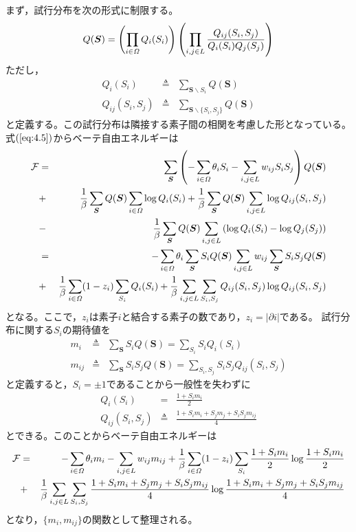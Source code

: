 まず，試行分布を次の形式に制限する。
\begin{equation}
Q(\bm{S})=\left(\prod_{i\in\mathit{\Omega}}Q_{i}(S_{i})\right)
\left(\prod_{i,j\in L}\frac{Q_{ij}(S_{i},S_{j})}
{Q_{i}(S_{i})Q_{j}(S_{j})}\right)\label{eq:4.15}
\end{equation}
ただし，
\begin{eqnarray}
Q_{i}(S_{i})&\triangleq&\sum_{\bm{S}\backslash S_{i}}Q(\bm{S})\label{eq:4.16}\\
Q_{ij}(S_{i},S_{j})&\triangleq&
\sum_{\bm{S}\backslash\{S_{i},S_{j}\}}Q(\bm{S})\label{eq:4.17}
\end{eqnarray}
と定義する。この試行分布は隣接する素子間の相関を考慮した形となっている。
式$(\ref{eq:4.5})$からベーテ自由エネルギーは
\begin{eqnarray}
\mathcal{F}&=&\sum_{\bm{S}}\left(-\sum_{i\in\mathit{\Omega}}\theta_{i}S_{i}
-\sum_{i,j\in L}w_{ij}S_{i}S_{j}\right)Q(\bm{S})\nonumber\\
&+&\frac{1}{\beta}\sum_{\bm{S}}Q(\bm{S})\sum_{i\in\mathit{\Omega}}\log Q_{i}(S_{i})
+\frac{1}{\beta}\sum_{\bm{S}}Q(\bm{S})\sum_{i,j\in L}\log Q_{ij}(S_{i},S_{j})
\nonumber\\
&-&\frac{1}{\beta}\sum_{\bm{S}}Q(\bm{S})\sum_{i,j\in L}\left(
\log Q_{i}(S_{i})-\log Q_{j}(S_{j})\right)\nonumber\\
&=&-\sum_{i\in\mathit{\Omega}}\theta_{i}\sum_{\bm{S}}S_{i}Q(\bm{S})
\sum_{i,j\in L}w_{ij}\sum_{\bm{S}}S_{i}S_{j}Q(\bm{S})\nonumber\\
&+&\frac{1}{\beta}\sum_{i\in\mathit{\Omega}}(1-z_{i})\sum_{S_{i}}Q_{i}(S_{i})
+\frac{1}{\beta}\sum_{i,j\in L}\sum_{S_{i},S_{j}}Q_{ij}(S_{i},S_{j})
\log Q_{ij}(S_{i},S_{j})\label{eq:4.18}
\end{eqnarray}
となる。ここで，$z_{i}$は素子$i$と結合する素子の数であり，$z_{i}=|\partial i|$である。
試行分布に関する$S_{i}$の期待値を
\begin{eqnarray}
m_{i}&\triangleq&\sum_{\bm{S}}S_{i}Q(\bm{S})=\sum_{S_{i}}S_{i}Q_{i}(S_{i})\label{eq:4.19}\\
m_{ij}&\triangleq&\sum_{\bm{S}}S_{i}S_{j}Q(\bm{S})=\sum_{S_{i},S_{j}}S_{i}S_{j}Q_{ij}(S_{i},S_{j})\label{eq:4.20}
\end{eqnarray}
と定義すると，$S_{i}=\pm 1$であることから一般性を失わずに
\begin{eqnarray}
Q_{i}(S_{i})&=&\frac{1+S_{i}m_{i}}{2}\label{eq:4.21}\\
Q_{ij}(S_{i},S_{j})&\triangleq&\frac{1+S_{i}m_{i}+S_{j}m_{j}+S_{i}S_{j}m_{ij}}{4}
\label{eq:4.22}
\end{eqnarray}
とできる。このことからベーテ自由エネルギーは
\begin{eqnarray}
\mathcal{F}&=&-\sum_{i\in\mathit{\Omega}}\theta_{i}m_{i}-\sum_{i,j\in L}w_{ij}m_{ij}
+\frac{1}{\beta}\sum_{i\in\mathit{\Omega}}(1-z_{i})\sum_{S_{i}}\frac{1+S_{i}m_{i}}{2}
\log\frac{1+S_{i}m_{i}}{2}\nonumber\\
&+&\frac{1}{\beta}\sum_{i,j\in
L}\sum_{S_{i},S_{j}}\frac{1+S_{i}m_{i}+S_{j}m_{j}+S_{i}S_{j}m_{ij}}{4}
\log\frac{1+S_{i}m_{i}+S_{j}m_{j}+S_{i}S_{j}m_{ij}}{4}\label{eq:4.23}
\end{eqnarray}
となり，$\{m_{i},m_{ij}\}$の関数として整理される。

